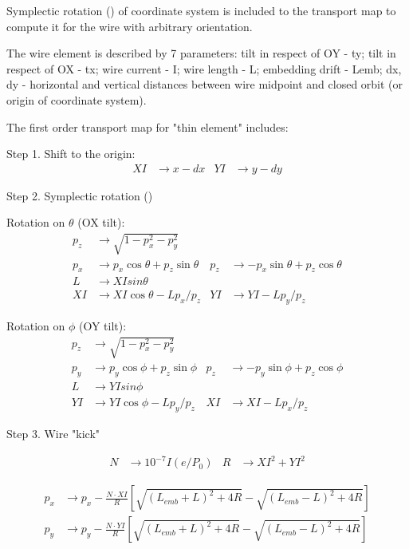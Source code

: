 \documentclass[english]{article}
\begin{document}
Symplectic rotation (\cite{forest99}) of coordinate system is included to the transport map to compute it for the wire with arbitrary orientation.  

The wire element is described by 7 parameters: 
tilt in respect of OY - ty; tilt in respect of OX - tx; wire current - I; wire length - L; embedding drift - Lemb; dx, dy - horizontal and vertical distances between wire midpoint and closed orbit (or origin of coordinate system).    

The first order transport map for "thin element" includes:

 Step 1. Shift to the origin:
 \begin{align*}
 XI &  \to x-dx &
 YI &  \to y-dy
 \end{align*}

 Step 2. Symplectic rotation (\cite{forest99}) 
 
 Rotation on $\theta$ (OX tilt):
 \begin{align}
p_z & \to \sqrt{1-p_x^2-p_y^2} \\
p_x & \to   p_x \cos \theta + p_z \sin\theta &
p_z & \to - p_x \sin \theta + p_z \cos\theta \\
L & \to XI sin\theta \\
XI & \to XI \cos\theta - L p_x/p_z  &
YI & \to YI - L p_y/p_z  
\end{align}

Rotation on $\phi$ (OY tilt):
\begin{align}
p_z & \to \sqrt{1-p_x^2-p_y^2} \\
p_y & \to   p_y \cos \phi + p_z \sin\phi &
p_z & \to - p_y \sin \phi + p_z \cos\phi \\
L & \to YI sin\phi \\
YI & \to YI \cos\phi - L p_y/p_z  &
XI & \to XI - L p_x/p_z  
\end{align}

  Step 3. Wire "kick"
  
  \begin{align*}
  N & \to 10^{-7} I (e/P_0) &
  R & \to XI^2 + YI^2
  \end{align*}
  
 \begin{align}
     p_x &\to p_x - \frac{N\cdot XI}{R}
     \left[\sqrt{(L_{emb}+L)^2+4R}-\sqrt{(L_{emb}-L)^2+4R} \right] \\
    p_y &\to p_y - \frac{N\cdot YI}{R}
    \left[\sqrt{(L_{emb}+L)^2+4R}-\sqrt{(L_{emb}-L)^2+4R} \right] 
\end{align}
\end{document}
